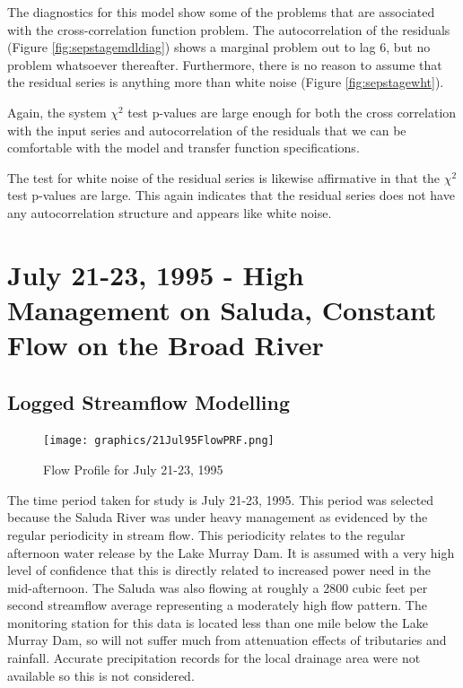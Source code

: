 \documentclass[12pt]{report}
\begin{document}
The diagnostics for this model show some of the problems that are
associated with the cross-correlation function problem.  The
autocorrelation of the residuals (Figure
\ref{fig:sepstagemdldiag}) shows a marginal problem out to lag 6,
but no problem whatsoever thereafter.  Furthermore, there is no
reason to assume that the residual series is anything more than
white noise (Figure \ref{fig:sepstagewht}).


Again, the system $\chi^2$ test p-values are large enough for both
the cross correlation with the input series and autocorrelation of
the residuals that we can be comfortable with the model and
transfer function specifications.

The test for white noise of the residual series is likewise
affirmative in that the $\chi^2$ test p-values are large.  This
again indicates that the residual series does not have any
autocorrelation structure and appears like white noise.



\clearpage
\section{July 21-23, 1995 - High Management on Saluda, Constant Flow on the Broad River}
\subsection{Logged Streamflow Modelling}
\begin{figure}[h]
\centering\texttt{[image: graphics/21Jul95FlowPRF.png]}
\centering\caption{Flow Profile for July 21-23, 1995}
\end{figure}
The time period taken for study is July 21-23, 1995.  This period
was selected because the Saluda River was under heavy management
as evidenced by the regular periodicity in stream flow. This
periodicity relates to the regular afternoon water release by the
Lake Murray Dam.  It is assumed with a very high level of
confidence that this is directly related to increased power need
in the mid-afternoon. The Saluda was also flowing at roughly a
2800 cubic feet per second streamflow average representing a
moderately high flow pattern. The monitoring station for this data
is located less than one mile below the Lake Murray Dam, so will
not suffer much from attenuation effects of tributaries and
rainfall.  Accurate precipitation records for the local drainage
area were not available so this is not considered.
\end{document}

